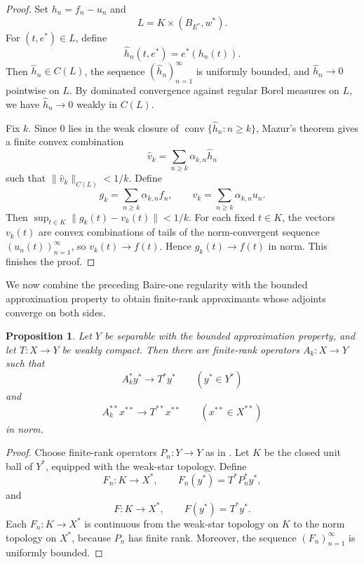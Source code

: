 \documentclass[11pt,reqno]{amsart}
\makeatletter
\theoremstyle{plain}
\newtheorem{proposition}[proposition]{Proposition}
\theoremstyle{definition}
\newcounter{problempaper}
\newenvironment{problempaperbody}{%
  \setcounter{subsection}{0}%
  \setcounter{subsubsection}{0}%
  \setcounter{paragraph}{0}%
  \renewcommand{\thesubsection}{\arabic{subsection}}%
  \renewcommand{\thesubsubsection}{\thesubsection.\arabic{subsubsection}}%
  \renewcommand{\theparagraph}{\thesubsubsection.\arabic{paragraph}}%
  \let\problem@outersection\section
  \let\problem@outersubsection\subsection
  \let\problem@outersubsubsection\subsubsection
  \let\problem@outerparagraph\paragraph
  \let\section\problem@papersection
  \let\subsection\problem@papersubsection
  \let\subsubsection\problem@papersubsubsection
}{%
  \let\section\problem@outersection
  \let\subsection\problem@outersubsection
  \let\subsubsection\problem@outersubsubsection
  \let\paragraph\problem@outerparagraph
}
\newcommand{\problem@target}[2]{%
  \hypertarget{problem-\theproblempaper-#1-#2}{}%
}
\newcommand{\problem@paperheading}[3]{%
  \par\bigskip
  \problem@target{#1}{#2}%
  \noindent{\large\bfseries #2.\quad #3\par}%
  \nobreak\smallskip
}
\newcommand{\problem@papersubheading}[3]{%
  \par\medskip
  \problem@target{#1}{#2}%
  \noindent{\normalsize\bfseries #2.\quad #3\par}%
  \nobreak\smallskip
}
\newcommand{\problem@papersubsubheading}[3]{%
  \par\smallskip
  \problem@target{#1}{#2}%
  \noindent{\normalsize\itshape #2.\quad #3.\ }%
}
\def\problem@papersection{%
  \@ifstar{\problem@papersectionstar}{\problem@papersectionnostar}%
}
\def\problem@papersectionstar#1{%
  \par\bigskip\noindent{\large\bfseries #1\par}\nobreak\smallskip
}
\def\problem@papersectionnostar#1{%
  \refstepcounter{subsection}%
  \setcounter{subsubsection}{0}%
  \setcounter{paragraph}{0}%
  \problem@paperheading{section}{\thesubsection}{#1}%
  \problem@writecontentsline{section}{\thesubsection}{#1}%
}
\def\problem@papersubsection{%
  \@ifstar{\problem@papersubsectionstar}{\problem@papersubsectionnostar}%
}
\def\problem@papersubsectionstar#1{%
  \par\medskip\noindent{\normalsize\bfseries #1\par}\nobreak\smallskip
}
\def\problem@papersubsectionnostar#1{%
  \refstepcounter{subsubsection}%
  \setcounter{paragraph}{0}%
  \problem@papersubheading{subsection}{\thesubsubsection}{#1}%
  \problem@writecontentsline{subsection}{\thesubsubsection}{#1}%
}
\def\problem@papersubsubsection{%
  \@ifstar{\problem@papersubsubsectionstar}{\problem@papersubsubsectionnostar}%
}
\def\problem@papersubsubsectionstar#1{%
  \par\smallskip\noindent{\normalsize\itshape #1.\ }%
}
\def\problem@papersubsubsectionnostar#1{%
  \refstepcounter{paragraph}%
  \problem@papersubsubheading{subsubsection}{\theparagraph}{#1}%
  \problem@writecontentsline{subsubsection}{\theparagraph}{#1}%
}
\newcommand{\problem@writecontentsline}[3]{%
  \begingroup
  \protected@write\@auxout{}{%
    \string\problemcontentsentry{\theproblempaper}{#1}{#2}{#3}{\thepage}%
  }%
  \endgroup
}
\newcommand{\problemcontentsentry}[5]{%
  \@ifundefined{problemcontents@#1}{%
    \expandafter\gdef\csname problemcontents@#1\endcsname{}%
  }{}%
  \expandafter\g@addto@macro\csname problemcontents@#1\endcsname{%
    \problemcontentsline{#1}{#2}{#3}{#4}{#5}%
  }%
}
\newcommand{\problemcontentslink}[4]{%
  \hyperlink{problem-#1-#2-#3}{#4}%
}
\newcommand{\problemcontentsline}[5]{%
  \ifstrequal{#2}{section}{%
    \par\noindent
    \problemcontentslink{#1}{#2}{#3}{\makebox[2.5em][l]{#3}#4}%
    \nobreak\dotfill
    \problemcontentslink{#1}{#2}{#3}{#5}\par
  }{%
    \ifstrequal{#2}{subsection}{%
      \par\noindent\hspace*{1.5em}%
      \problemcontentslink{#1}{#2}{#3}{\makebox[3.5em][l]{#3}#4}%
      \nobreak\dotfill
      \problemcontentslink{#1}{#2}{#3}{#5}\par
    }{%
      \par\noindent\hspace*{3em}%
      \problemcontentslink{#1}{#2}{#3}{\makebox[4.5em][l]{#3}#4}%
      \nobreak\dotfill
      \problemcontentslink{#1}{#2}{#3}{#5}\par
    }%
  }%
}
\makeatother
\begin{document}
\begin{problempaperbody}
\begin{proof}
Set $h_n=f_n-u_n$ and
\begin{equation*}
        L=K\times(B_{E^*},w^*).
\end{equation*}
For $(t,e^*)\in L$, define
\begin{equation*}
        \widehat h_n(t,e^*)=e^*(h_n(t)).
\end{equation*}
Then $\widehat h_n\in C(L)$, the sequence $(\widehat h_n)_{n=1}^\infty$ is uniformly bounded, and $\widehat h_n\to0$ pointwise on $L$. By dominated convergence against regular Borel measures on $L$, we have $\widehat h_n\to0$ weakly in $C(L)$.

Fix $k$. Since $0$ lies in the weak closure of $\operatorname{conv}\{\widehat h_n\colon n\geq k\}$, Mazur's theorem gives a finite convex combination
\begin{equation*}
        \widehat v_k=\sum_{n\geq k}\alpha_{k,n}\widehat h_n
\end{equation*}
such that $\|\widehat v_k\|_{C(L)}<1/k$. Define
\begin{equation*}
        g_k=\sum_{n\geq k}\alpha_{k,n}f_n,
        \qquad
        v_k=\sum_{n\geq k}\alpha_{k,n}u_n.
\end{equation*}
Then $\sup_{t\in K}\|g_k(t)-v_k(t)\|<1/k$. For each fixed $t\in K$, the vectors $v_k(t)$ are convex combinations of tails of the norm-convergent sequence $(u_n(t))_{n = 1}^\infty$, so $v_k(t)\to f(t)$. Hence $g_k(t)\to f(t)$ in norm. This finishes the proof.
\end{proof}


We now combine the preceding Baire-one regularity with the bounded approximation property to obtain finite-rank approximants whose adjoints converge on both sides.

\begin{proposition}
\label{p5:prop:two-sided-approximants}
Let $Y$ be separable with the bounded approximation property, and let $T\colon X\to Y$ be weakly compact. Then there are finite-rank operators $A_k\colon X\to Y$ such that
\begin{equation*}
        A_k^*y^*\to T^*y^* \qquad (y^*\in Y^*)
\end{equation*}
and
\begin{equation*}
        A_k^{**}x^{**}\to T^{**}x^{**} \qquad (x^{**}\in X^{**})
\end{equation*}
in norm.
\end{proposition}
\begin{proof}
Choose finite-rank operators $P_n\colon Y\to Y$ as in . Let $K$ be the closed unit ball of $Y^*$, equipped with the weak-star topology. Define
\begin{equation*}
        F_n\colon K\to X^*, \qquad F_n(y^*)=T^*P_n^*y^*,
\end{equation*}
and
\begin{equation*}
        F\colon K\to X^*, \qquad F(y^*)=T^*y^*.
\end{equation*} 
Each $F_n\colon K\to X^*$ is continuous from the weak-star topology on $K$ to the norm topology on $X^*$, because $P_n$ has finite rank. Moreover, the sequence $(F_n)_{n=1}^\infty$ is uniformly bounded.


\end{proof}
\end{problempaperbody}
\end{document}

